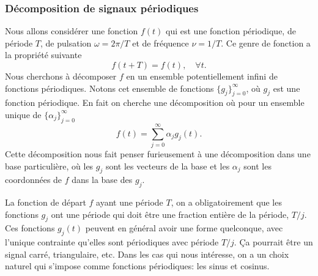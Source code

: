 \documentclass[a4paper,12pt]{book}
\begin{document}
\subsubsection{Décomposition de signaux périodiques}

Nous allons considérer une fonction $f(t)$ qui est une fonction périodique, de période $T$, de pulsation $\omega=2\pi/T$ et
de fréquence $\nu=1/T$. Ce genre de fonction a la propriété suivante
\begin{equation}
 f(t+T)=f(t),\quad \forall t.
\end{equation}
Nous cherchons à décomposer $f$ en un ensemble potentiellement infini de fonctions périodiques. Notons
cet ensemble de fonctions $\{g_j\}_{j=0}^\infty$, où $g_j$ est une fonction périodique. En fait on cherche une décomposition
où pour un ensemble unique de $\{\alpha_j\}_{j=0}^\infty$
\begin{equation}
 f(t)=\sum_{j=0}^\infty \alpha_j g_j(t).
\end{equation}
Cette décomposition nous fait penser furieusement à une décomposition dans une base particulière, 
où les $g_j$ sont les vecteurs de la base et les $\alpha_j$ sont les coordonnées de $f$ dans la base des $g_j$.

La fonction de départ $f$ ayant une période $T$, on a obligatoirement que les fonctions $g_j$ ont une période 
qui doit être une fraction entière de la période, $T/j$. Ces fonctions $g_j(t)$ peuvent en général
avoir une forme quelconque, avec l'unique contrainte qu'elles sont périodiques avec période $T/j$. 
\c Ca pourrait être un signal carré, triangulaire, etc. Dans les cas qui nous intéresse, on a un choix
naturel qui s'impose comme fonctions périodiques: les sinus et cosinus.
\end{document}

